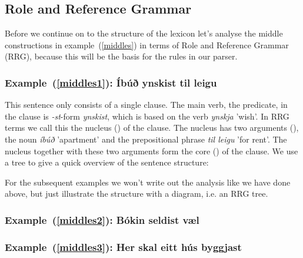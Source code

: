 \documentclass[12pt,%
]{lin-v2/lin}
\let\Oldsubsection\subsection
\renewcommand{\subsection}{\FloatBarrier\Oldsubsection}
\let\Oldsubsubsection\subsubsection
\renewcommand{\subsubsection}{\FloatBarrier\Oldsubsubsection}
\newcommand{\pref}[1]{(\ref{#1})}
\begin{document}
\subsection{Role and Reference Grammar}

Before we continue on to the structure of the lexicon let's analyse the middle constructions in example~\pref{middles}
in terms of Role and Reference Grammar (RRG), because this will be the basis for the rules in our parser.

\subsubsection*{Example~\pref{middles1}: Íbúð ynskist til leigu}

This sentence only consists of a single clause. The main verb, the predicate, in the clause
is \emph{-st}-form \emph{ynskist}, which is based on the verb \emph{ynskja} 'wish'. 
In RRG terms we call this the nucleus (\Nuc) of the clause.
The nucleus has two arguments (\Arg), the noun \emph{íbúð} 'apartment' and the prepositional
phrase \emph{til leigu} 'for rent'. The nucleus together with these two arguments form the core (\Core)
of the clause. We use a tree to give a quick overview of the sentence structure:

\begin{exe}
    \ex
\end{exe}

For the subsequent examples we won't write out the analysis like we have done above, but
just illustrate the structure with a diagram, i.e. an RRG tree.

\subsubsection*{Example~\pref{middles2}: Bókin seldist væl}

\begin{exe}
    \ex
\end{exe}

\subsubsection*{Example~\pref{middles3}: Her skal eitt hús byggjast}
\end{document}

